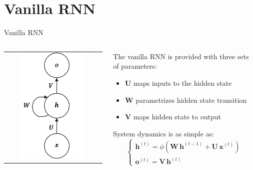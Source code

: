 \documentclass[aspectratio=169]{beamer}
\begin{document}
\section{Vanilla RNN}

\begin{frame}{Vanilla RNN}
\begin{columns}
\begin{column}{0.3\textwidth}
\begin{tabular}{c}
	\includegraphics[width=0.7\textwidth]{img/rnn/vanilla_rnn.png}
\end{tabular}
\end{column}
\begin{column}{0.7\textwidth}
The vanilla RNN is provided with three sets of parameters:
\begin{itemize}
	\item $\bm{U}$ maps inputs to the hidden state
	\item $\bm{W}$ parametrizes hidden state transition
	\item $\bm{V}$ maps hidden state to output 
\end{itemize}
\vspace{0.5cm}
System dynamics is as simple as:
\begin{equation}
	\begin{cases}
	\bm{h}^{(t)} = \phi(\bm{W}\,\bm{h}^{(t-1)} + \bm{U}\,\bm{x}^{(t)})\\
	\bm{o}^{(t)} = \bm{V}\,\bm{h}^{(t)}
	\end{cases}
\end{equation}
\end{column}
\end{columns}
\end{frame}
\end{document}
